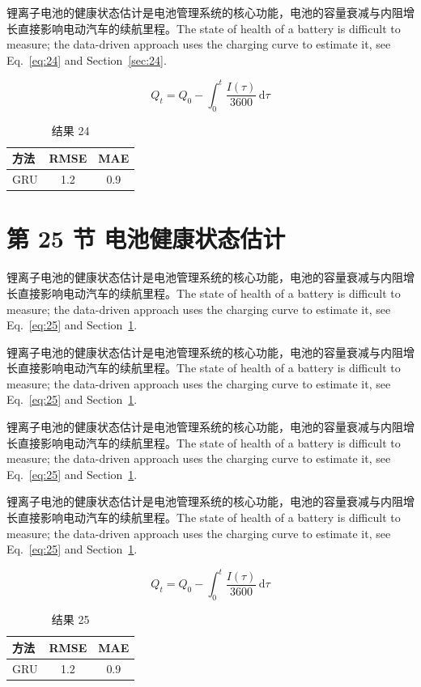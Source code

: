 \documentclass[UTF8,fontset=mac]{ctexart}
\begin{document}
锂离子电池的健康状态估计是电池管理系统的核心功能，电池的容量衰减与内阻增长直接影响电动汽车的续航里程\cite{a2020}。The state of health of a battery is difficult to measure; the data-driven approach uses the charging curve to estimate it, see Eq.~\eqref{eq:24} and Section~\ref{sec:24}.

\begin{equation}\label{eq:24}
  Q_t = Q_0 - \int_0^t \frac{I(\tau)}{3600}\,\mathrm{d}\tau
\end{equation}
\begin{table}[h]\centering\begin{tabular}{lcc}\toprule 方法 & RMSE & MAE\\\midrule GRU & 1.2 & 0.9\\\bottomrule\end{tabular}\caption{结果 24}\end{table}

\section{第 25 节 电池健康状态估计}\label{sec:25}
锂离子电池的健康状态估计是电池管理系统的核心功能，电池的容量衰减与内阻增长直接影响电动汽车的续航里程\cite{a2020}。The state of health of a battery is difficult to measure; the data-driven approach uses the charging curve to estimate it, see Eq.~\eqref{eq:25} and Section~\ref{sec:25}.

锂离子电池的健康状态估计是电池管理系统的核心功能，电池的容量衰减与内阻增长直接影响电动汽车的续航里程\cite{a2020}。The state of health of a battery is difficult to measure; the data-driven approach uses the charging curve to estimate it, see Eq.~\eqref{eq:25} and Section~\ref{sec:25}.

锂离子电池的健康状态估计是电池管理系统的核心功能，电池的容量衰减与内阻增长直接影响电动汽车的续航里程\cite{a2020}。The state of health of a battery is difficult to measure; the data-driven approach uses the charging curve to estimate it, see Eq.~\eqref{eq:25} and Section~\ref{sec:25}.

锂离子电池的健康状态估计是电池管理系统的核心功能，电池的容量衰减与内阻增长直接影响电动汽车的续航里程\cite{a2020}。The state of health of a battery is difficult to measure; the data-driven approach uses the charging curve to estimate it, see Eq.~\eqref{eq:25} and Section~\ref{sec:25}.

\begin{equation}\label{eq:25}
  Q_t = Q_0 - \int_0^t \frac{I(\tau)}{3600}\,\mathrm{d}\tau
\end{equation}
\begin{table}[h]\centering\begin{tabular}{lcc}\toprule 方法 & RMSE & MAE\\\midrule GRU & 1.2 & 0.9\\\bottomrule\end{tabular}\caption{结果 25}\end{table}
\end{document}

